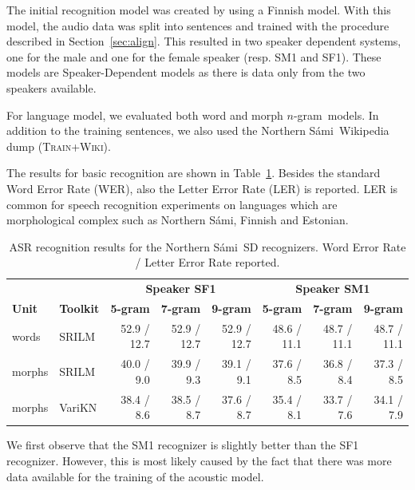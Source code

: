 \documentclass[b5paper]{article}
\newcommand{\ns}{Northern Sámi}
\newcommand{\ngram}{$n$-gram}
\newcommand{\ds}[1]{\textsc{#1}}
\begin{document}
The initial recognition model was created by using a Finnish model. With this model, the audio data was split into sentences and trained with the procedure described in Section~\ref{sec:align}. This resulted in two speaker dependent systems, one for the male and one for the female speaker (resp. SM1 and SF1). These models are Speaker-Dependent models as there is data only from the two speakers available.

For language model, we evaluated both word and morph \ngram\ models. In addition to the training sentences, we also used the \ns\ Wikipedia dump (\ds{Train+Wiki}).

The results for basic recognition are shown in Table~\ref{tbl:samibasic}. Besides the standard Word Error Rate (WER), also the Letter Error Rate (LER) is reported. LER is common for speech recognition experiments on languages which are morphological complex such as \ns, Finnish and Estonian.

\begin{table}[!h]
\centering
\begin{tabular}{ll|rrr|rrr}
& & \multicolumn{3}{|c|}{\textbf{Speaker SF1}} & \multicolumn{3}{|c}{\textbf{Speaker SM1}} \\
 \textbf{Unit} & \textbf{Toolkit} & \textbf{5-gram} & \textbf{7-gram} & \textbf{9-gram} & \textbf{5-gram} & \textbf{7-gram} & \textbf{9-gram}\\\hline
 words & SRILM & 52.9 / 12.7 & 52.9 / 12.7& 52.9 / 12.7&48.6 / 11.1 & 48.7 / 11.1 & 48.7 / 11.1\\
morphs & SRILM & 40.0 /  9.0 & 39.9 / 9.3& 39.1 / 9.1 & 37.6 / 8.5 & 36.8 / 8.4 & 37.3 / 8.5 \\
 morphs & VariKN  & 38.4 / 8.6& 38.5 / 8.7  & 37.6 / 8.7 & 35.4 / 8.1 &  33.7 / 7.6 & 34.1 / 7.9 \\

\end{tabular}
\caption{ASR recognition results for the \ns\ SD recognizers. Word Error Rate / Letter Error Rate reported.\label{tbl:samibasic}}
\end{table}


We first observe that the SM1 recognizer is slightly better than the SF1 recognizer. However, this is most likely caused by the fact that there was more data available for the training of the acoustic model.
\end{document}
